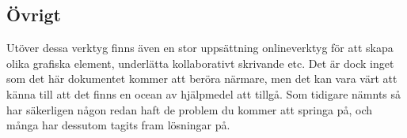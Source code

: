 \subsection{Övrigt}
Utöver dessa verktyg finns även en stor uppsättning onlineverktyg för att skapa olika grafiska element, underlätta kollaborativt skrivande etc. Det är dock inget som det här dokumentet kommer att beröra närmare, men det kan vara värt att känna till att det finns en ocean av hjälpmedel att tillgå. Som tidigare nämnts så har säkerligen någon redan haft de problem du kommer att springa på, och många har dessutom tagits fram lösningar på.
